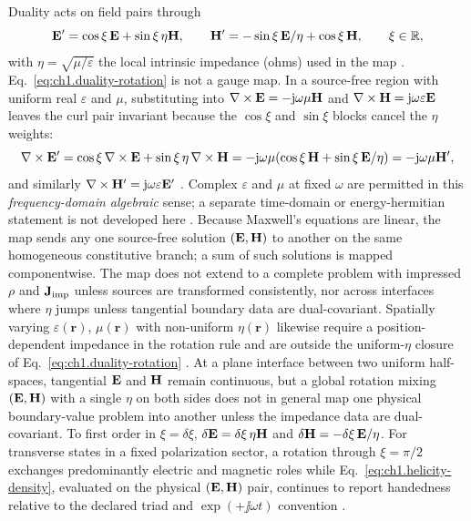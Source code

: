 Duality acts on field pairs through
\begin{equation}
\label{eq:ch1.duality-rotation}
\mathbf{E}'=\cos\xi\,\mathbf{E}+\sin\xi\,\eta\mathbf{H},\qquad
\mathbf{H}'=-\sin\xi\,\mathbf{E}/\eta+\cos\xi\,\mathbf{H},\qquad \xi\in\mathbb{R},
\end{equation}
with $\eta=\sqrt{\mu/\varepsilon}$ the local intrinsic impedance (ohms) used in the map \cite{stratton1941}. Eq.~\eqref{eq:ch1.duality-rotation} is not a gauge map. In a source-free region with uniform real $\varepsilon$ and $\mu$, substituting into $\nabla\times\mathbf{E}=-\mathrm{j}\omega\mu\mathbf{H}$ and $\nabla\times\mathbf{H}=\mathrm{j}\omega\varepsilon\mathbf{E}$ leaves the curl pair invariant because the $\cos\xi$ and $\sin\xi$ blocks cancel the $\eta$ weights:
\[
\nabla\times\mathbf{E}'=\cos\xi\,\nabla\times\mathbf{E}+\sin\xi\,\eta\,\nabla\times\mathbf{H}
=-\mathrm{j}\omega\mu(\cos\xi\,\mathbf{H}+\sin\xi\,\mathbf{E}/\eta)
=-\mathrm{j}\omega\mu\mathbf{H}',
\]
and similarly $\nabla\times\mathbf{H}'=\mathrm{j}\omega\varepsilon\mathbf{E}'$ \cite{stratton1941,fernandezcorbaton2013}. Complex $\varepsilon$ and $\mu$ at fixed $\omega$ are permitted in this \emph{frequency-domain algebraic} sense; a separate time-domain or energy-hermitian statement is not developed here \cite{stratton1941}. Because Maxwell's equations are linear, the map sends any one source-free solution $(\mathbf{E},\mathbf{H})$ to another on the same homogeneous constitutive branch; a sum of such solutions is mapped componentwise. The map does not extend to a complete problem with impressed $\rho$ and $\mathbf{J}_{\mathrm{imp}}$ unless sources are transformed consistently, nor across interfaces where $\eta$ jumps unless tangential boundary data are dual-covariant. Spatially varying $\varepsilon(\mathbf r)$, $\mu(\mathbf r)$ with non-uniform $\eta(\mathbf r)$ likewise require a position-dependent impedance in the rotation rule and are outside the uniform-$\eta$ closure of Eq.~\eqref{eq:ch1.duality-rotation} \cite{stratton1941,fernandezcorbaton2013}. At a plane interface between two uniform half-spaces, tangential $\mathbf{E}$ and $\mathbf{H}$ remain continuous, but a global rotation mixing $(\mathbf{E},\mathbf{H})$ with a single $\eta$ on both sides does not in general map one physical boundary-value problem into another unless the impedance data are dual-covariant. To first order in $\xi=\delta\xi$, $\delta\mathbf{E}=\delta\xi\,\eta\mathbf{H}$ and $\delta\mathbf{H}=-\delta\xi\,\mathbf{E}/\eta$. For transverse states in a fixed polarization sector, a rotation through $\xi=\pi/2$ exchanges predominantly electric and magnetic roles while Eq.~\eqref{eq:ch1.helicity-density}, evaluated on the physical $(\mathbf{E},\mathbf{H})$ pair, continues to report handedness relative to the declared triad and $\exp(+\jj\omega t)$ convention \cite{stratton1941,belinfante1940}.


